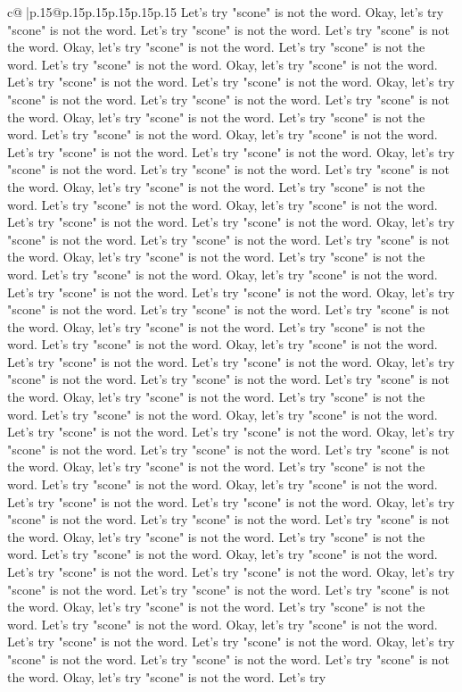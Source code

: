 \documentclass{article}
\begin{document}
{\begin{supertabular}{c@{$\;$}|p{.15\linewidth}@{}p{.15\linewidth}p{.15\linewidth}p{.15\linewidth}p{.15\linewidth}p{.15\linewidth}}
{{{Let's try "scone" is not the word. Okay, let's try "scone" is not the word. Let's try "scone" is not the word. Let's try "scone" is not the word. Okay, let's try "scone" is not the word. Let's try "scone" is not the word. Let's try "scone" is not the word. Okay, let's try "scone" is not the word. Let's try "scone" is not the word. Let's try "scone" is not the word. Okay, let's try "scone" is not the word. Let's try "scone" is not the word. Let's try "scone" is not the word. Okay, let's try "scone" is not the word. Let's try "scone" is not the word. Let's try "scone" is not the word. Okay, let's try "scone" is not the word. Let's try "scone" is not the word. Let's try "scone" is not the word. Okay, let's try "scone" is not the word. Let's try "scone" is not the word. Let's try "scone" is not the word. Okay, let's try "scone" is not the word. Let's try "scone" is not the word. Let's try "scone" is not the word. Okay, let's try "scone" is not the word. Let's try "scone" is not the word. Let's try "scone" is not the word. Okay, let's try "scone" is not the word. Let's try "scone" is not the word. Let's try "scone" is not the word. Okay, let's try "scone" is not the word. Let's try "scone" is not the word. Let's try "scone" is not the word. Okay, let's try "scone" is not the word. Let's try "scone" is not the word. Let's try "scone" is not the word. Okay, let's try "scone" is not the word. Let's try "scone" is not the word. Let's try "scone" is not the word. Okay, let's try "scone" is not the word. Let's try "scone" is not the word. Let's try "scone" is not the word. Okay, let's try "scone" is not the word. Let's try "scone" is not the word. Let's try "scone" is not the word. Okay, let's try "scone" is not the word. Let's try "scone" is not the word. Let's try "scone" is not the word. Okay, let's try "scone" is not the word. Let's try "scone" is not the word. Let's try "scone" is not the word. Okay, let's try "scone" is not the word. Let's try "scone" is not the word. Let's try "scone" is not the word. Okay, let's try "scone" is not the word. Let's try "scone" is not the word. Let's try "scone" is not the word. Okay, let's try "scone" is not the word. Let's try "scone" is not the word. Let's try "scone" is not the word. Okay, let's try "scone" is not the word. Let's try "scone" is not the word. Let's try "scone" is not the word. Okay, let's try "scone" is not the word. Let's try "scone" is not the word. Let's try "scone" is not the word. Okay, let's try "scone" is not the word. Let's try "scone" is not the word. Let's try "scone" is not the word. Okay, let's try "scone" is not the word. Let's try "scone" is not the word. Let's try "scone" is not the word. Okay, let's try "scone" is not the word. Let's try "scone" is not the word. Let's try "scone" is not the word. Okay, let's try "scone" is not the word. Let's try "scone" is not the word. Let's try "scone" is not the word. Okay, let's try "scone" is not the word. Let's try "scone" is not the word. Let's try "scone" is not the word. Okay, let's try "scone" is not the word. Let's try "scone" is not the word. Let's try "scone" is not the word. Okay, let's try "scone" is not the word. Let's try }}}
\end{supertabular}}
\end{document}
